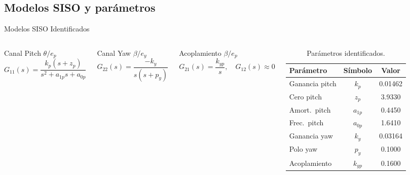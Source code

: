 \documentclass[mathserif,spanish,10pt]{beamer}
\begin{document}
\subsection{Modelos SISO y parámetros}

\begin{frame}{Modelos SISO Identificados}
\begin{columns}[T]
  \begin{block}{Canal Pitch $\theta/e_p$}
    \[
      G_{11}(s) = \frac{k_p(s + z_p)}{s^2 + a_{1p}s + a_{0p}}
    \]
  \end{block}
  \vspace{-4pt}
  \begin{block}{Canal Yaw $\beta/e_y$}
    \[
      G_{22}(s) = \frac{-k_y}{s(s + p_y)}
    \]
  \end{block}
  \vspace{-4pt}
  \begin{block}{Acoplamiento $\beta/e_p$}
    \[
      G_{21}(s) = \frac{k_{yp}}{s}, \quad G_{12}(s)\approx 0
    \]
  \end{block}

  \begin{table}
    \centering
    \caption{Parámetros identificados.}
    \scriptsize
    \begin{tabular}{lcc}
      \hline
      \rowcolor{rowhdr}
      \color{white}\textbf{Parámetro} &
      \color{white}\textbf{Símbolo} &
      \color{white}\textbf{Valor} \\
      \hline
      Ganancia pitch  & $k_p$    & 0.01462  \\
      Cero pitch      & $z_p$    & 3.9330   \\
      Amort.\ pitch   & $a_{1p}$ & 0.4450   \\
      Frec.\ pitch    & $a_{0p}$ & 1.6410   \\
      Ganancia yaw    & $k_y$    & 0.03164  \\
      Polo yaw        & $p_y$    & 0.1000   \\
      Acoplamiento    & $k_{yp}$ & 0.1600   \\
      \hline
    \end{tabular}
  \end{table}
\end{columns}
\end{frame}

\end{document}
